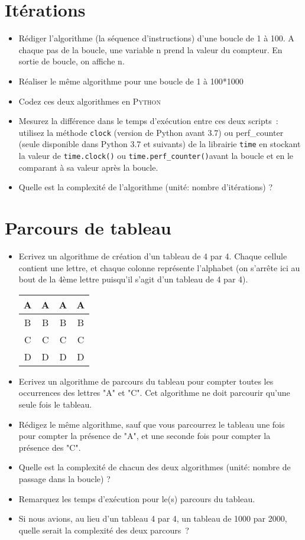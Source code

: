 \section{Itérations}

\begin{itemize}
  \item  Rédiger l'algorithme (la séquence d'instructions) d'une boucle de 1 à 100.  A chaque pas de la boucle, une variable n prend la valeur du compteur. En sortie de boucle, on affiche n.
  \item  Réaliser le même algorithme pour une boucle de 1 à 100*1000
  \item  Codez ces deux algorithmes en \textsc{Python}
  \item  Mesurez la différence dans le temps d'exécution entre ces deux scripts : utilisez la méthode \texttt{clock} (version de Python avant 3.7) ou perf\_counter (seule disponible dans Python 3.7 et suivants) de la librairie \texttt{time} en stockant la valeur de \texttt{time.clock()} ou  \texttt{time.perf\_counter()}avant la boucle et en le comparant à sa valeur après la boucle.
  \item  Quelle est la complexité de l'algorithme (unité: nombre d'itérations) ?
\end{itemize}

\section{Parcours de tableau}

\begin{itemize}
  \item  Ecrivez un algorithme de création d'un tableau de 4 par 4. Chaque cellule contient une lettre, et chaque colonne représente l'alphabet (on s'arrête ici au bout de la 4ème lettre puisqu'il s'agit d'un tableau de 4 par 4).

\begin{tabular}{c|c|c|c}
A&A&A&A\\
\hline
B&B&B&B\\
\hline
C&C&C&C\\
\hline
D&D&D&D\\
\end{tabular}

  \item  Ecrivez un algorithme de parcours du tableau pour compter toutes les occurrences des lettres "A" et "C". Cet algorithme ne doit parcourir qu'une seule fois le tableau.
  \item  Rédigez le même algorithme, sauf que vous parcourrez le tableau une fois pour compter la présence de "A", et une seconde fois pour compter la présence des "C".
  \item  Quelle est la complexité de chacun des deux algorithmes (unité: nombre de passage dans la boucle) ?
  \item  Remarquez les temps d'exécution pour le(s) parcours du tableau. 
  \item  Si nous avions, au lieu d'un tableau 4 par 4, un tableau de 1000 par 2000, quelle serait la complexité des deux parcours ?
\end{itemize}

